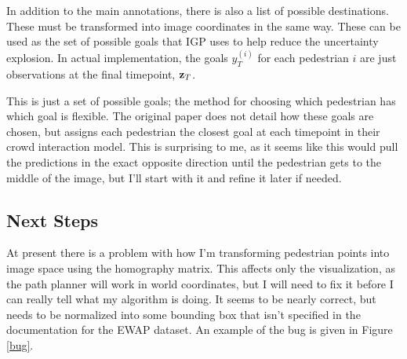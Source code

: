\documentclass[a4paper,11pt,headings=small]{article}
\begin{document}
In addition to the main annotations, there is also a list of possible destinations. These must be transformed into image coordinates in the same way. These can be used as the set of possible goals that IGP uses to help reduce the uncertainty explosion. In actual implementation, the goals $y^{(i)}_T$ for each pedestrian $i$ are just observations at the final timepoint, $\mathbf{z}_T$.

This is just a set of possible goals; the method for choosing which pedestrian has which goal is flexible. The original paper does not detail how these goals are chosen, but \cite{Pellegrini2009} assigns each pedestrian the closest goal at each timepoint in their crowd interaction model. This is surprising to me, as it seems like this would pull the predictions in the exact opposite direction until the pedestrian gets to the middle of the image, but I'll start with it and refine it later if needed.

\subsection*{Next Steps}
\quad At present there is a problem with how I'm transforming pedestrian points into image space using the homography matrix. This affects only the visualization, as the path planner will work in world coordinates, but I will need to fix it before I can really tell what my algorithm is doing. It seems to be nearly correct, but needs to be normalized into some bounding box that isn't specified in the documentation for the EWAP dataset. An example of the bug is given in Figure \ref{bug}.
\end{document}
